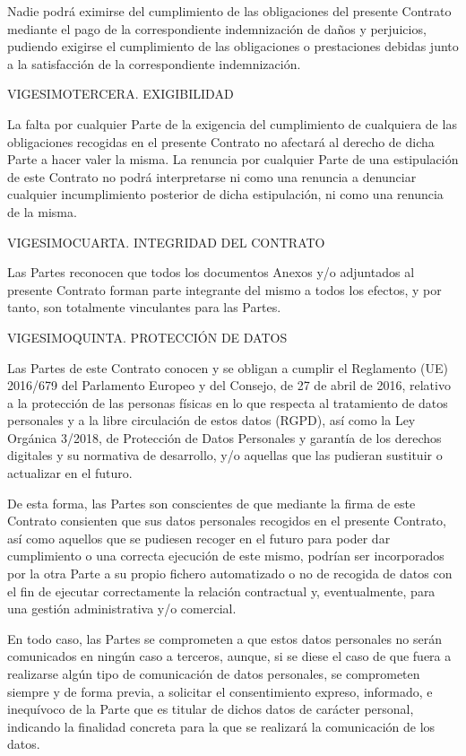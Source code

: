 \documentclass[a4paper,11pt]{report}
\begin{document}
Nadie podrá eximirse del cumplimiento de las obligaciones del presente
Contrato mediante el pago de la correspondiente indemnización de daños y
perjuicios, pudiendo exigirse el cumplimiento de las obligaciones o
prestaciones debidas junto a la satisfacción de la correspondiente
indemnización.

VIGESIMOTERCERA. EXIGIBILIDAD

La falta por cualquier Parte de la exigencia del cumplimiento de
cualquiera de las obligaciones recogidas en el presente Contrato no
afectará al derecho de dicha Parte a hacer valer la misma. La renuncia
por cualquier Parte de una estipulación de este Contrato no podrá
interpretarse ni como una renuncia a denunciar cualquier incumplimiento
posterior de dicha estipulación, ni como una renuncia de la misma.

VIGESIMOCUARTA. INTEGRIDAD DEL CONTRATO

Las Partes reconocen que todos los documentos Anexos y/o adjuntados al
presente Contrato forman parte integrante del mismo a todos los efectos,
y por tanto, son totalmente vinculantes para las Partes.

VIGESIMOQUINTA. PROTECCIÓN DE DATOS

Las Partes de este Contrato conocen y se obligan a cumplir el Reglamento
(UE) 2016/679 del Parlamento Europeo y del Consejo, de 27 de abril de
2016, relativo a la protección de las personas físicas en lo que
respecta al tratamiento de datos personales y a la libre circulación de
estos datos (RGPD), así como la Ley Orgánica 3/2018, de Protección de
Datos Personales y garantía de los derechos digitales y su normativa de
desarrollo, y/o aquellas que las pudieran sustituir o actualizar en el
futuro.

De esta forma, las Partes son conscientes de que mediante la firma de
este Contrato consienten que sus datos personales recogidos en el
presente Contrato, así como aquellos que se pudiesen recoger en el
futuro para poder dar cumplimiento o una correcta ejecución de este
mismo, podrían ser incorporados por la otra Parte a su propio fichero
automatizado o no de recogida de datos con el fin de ejecutar
correctamente la relación contractual y, eventualmente, para una gestión
administrativa y/o comercial.

En todo caso, las Partes se comprometen a que estos datos personales no
serán comunicados en ningún caso a terceros, aunque, si se diese el caso
de que fuera a realizarse algún tipo de comunicación de datos
personales, se comprometen siempre y de forma previa, a solicitar el
consentimiento expreso, informado, e inequívoco de la Parte que es
titular de dichos datos de carácter personal, indicando la finalidad
concreta para la que se realizará la comunicación de los datos.
\end{document}
